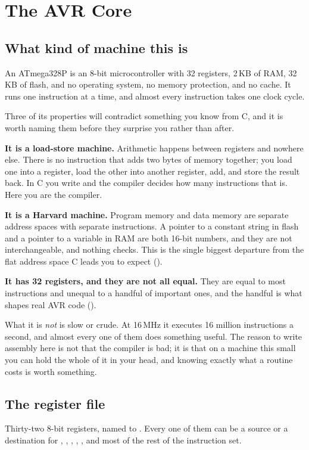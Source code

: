 
\section{The AVR Core}
\label{c1:sec:core}

\subsection{What kind of machine this is}
\label{c1:sec:machine}
An ATmega328P is an 8-bit microcontroller with 32 registers, 2\,KB of RAM, 32\,KB of flash, and
no operating system, no memory protection, and no cache. It runs one instruction at a time, and
almost every instruction takes one clock cycle.

Three of its properties will contradict something you know from C, and it is worth naming them
before they surprise you rather than after.

\textbf{It is a load-store machine.} Arithmetic happens between registers and nowhere else. There
is no instruction that adds two bytes of memory together; you load one into a register, load the
other into another register, add, and store the result back. In C you write  and the
compiler decides how many instructions that is. Here you are the compiler.

\textbf{It is a Harvard machine.} Program memory and data memory are separate address spaces with
separate instructions. A pointer to a constant string in flash and a pointer to a variable in RAM
are both 16-bit numbers, and they are not interchangeable, and nothing checks. This is the single
biggest departure from the flat address space C leads you to expect ().

\textbf{It has 32 registers, and they are not all equal.} They are equal to most instructions and
unequal to a handful of important ones, and the handful is what shapes real AVR code
().

What it is \emph{not} is slow or crude. At 16\,MHz it executes 16 million instructions a second,
and almost every one of them does something useful. The reason to write assembly here is not that
the compiler is bad; it is that on a machine this small you can hold the whole of it in your head,
and knowing exactly what a routine costs is worth something.

\subsection{The register file}
\label{c1:sec:regfile}
Thirty-two 8-bit registers, named  to . Every one of them can be a source or a
destination for , , , , ,  and most of the
rest of the instruction set.

